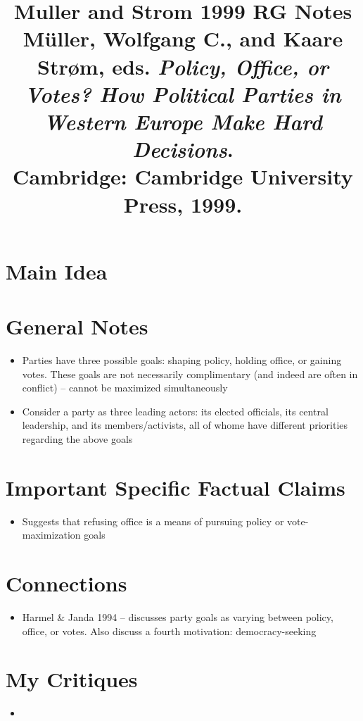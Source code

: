 \documentclass[12pt]{article}
\title{\textbf{Muller and Strom 1999 RG Notes}\\
\large M\"uller, Wolfgang C., and Kaare Str\o m, eds. \textit{Policy, Office, or Votes? How Political Parties in Western Europe Make Hard Decisions}.\\
Cambridge: Cambridge University Press, 1999.}
\author{}
\date{}
\begin{document}
\maketitle

\section{Main Idea}



\section{General Notes}

\begin{itemize}[leftmargin=*, itemsep=4pt]
    \item Parties have three possible goals: shaping policy, holding office, or gaining votes. These goals are not necessarily complimentary (and indeed are often in conflict) -- cannot be maximized simultaneously
    \item Consider a party as three leading actors: its elected officials, its central leadership, and its members/activists, all of whome have different priorities regarding the above goals
\end{itemize}


\section{Important Specific Factual Claims}

\begin{itemize}[leftmargin=*, itemsep=4pt]
    \item Suggests that refusing office is a means of pursuing policy or vote-maximization goals
\end{itemize}


\section{Connections}

\begin{itemize}
    \item Harmel \& Janda 1994 -- discusses party goals as varying between policy, office, or votes. Also discuss a fourth motivation: democracy-seeking
\end{itemize}


\section{My Critiques}

\begin{itemize}
    \item
\end{itemize}
\end{document}
